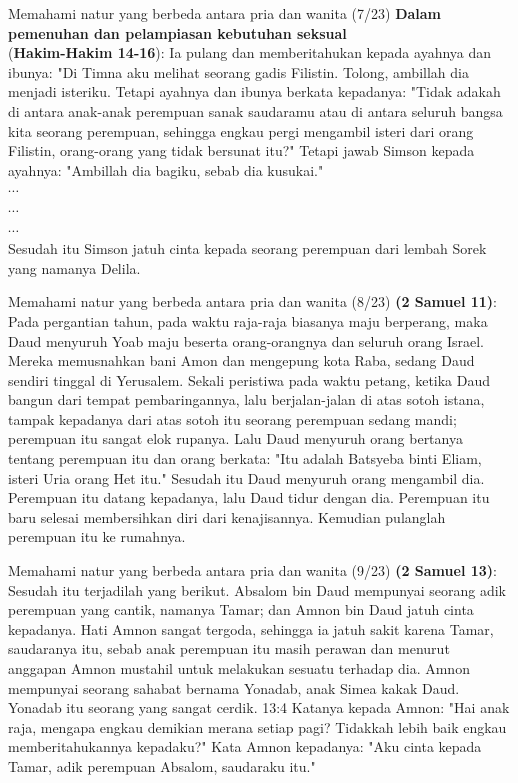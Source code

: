 \documentclass{beamer}
\theoremstyle{mystyle}
\let\emph\relax %
\begin{document}
\begin{frame}{Memahami natur yang berbeda antara pria dan wanita (7/23)}
	\textbf{Dalam pemenuhan dan pelampiasan kebutuhan seksual} \\
	\emph{Samson} (\textbf{Hakim-Hakim 14-16}):
	Ia pulang dan memberitahukan kepada ayahnya dan ibunya: "Di Timna aku melihat seorang gadis Filistin. Tolong, ambillah dia menjadi isteriku. Tetapi ayahnya dan ibunya berkata kepadanya: "Tidak adakah di antara anak-anak perempuan sanak saudaramu atau di antara seluruh bangsa kita seorang perempuan, sehingga engkau pergi mengambil isteri dari orang Filistin, orang-orang yang tidak bersunat itu?" Tetapi jawab Simson kepada ayahnya: "Ambillah dia bagiku, sebab dia kusukai." \\
	$\cdots$ \\
		$\cdots$ \\
			$\cdots$ \\
	Sesudah itu Simson jatuh cinta kepada seorang perempuan dari lembah Sorek yang namanya Delila.
\end{frame}

\begin{frame}{Memahami natur yang berbeda antara pria dan wanita (8/23)}
	\emph{Daud} \textbf{(2 Samuel 11)}: Pada pergantian tahun, pada waktu raja-raja biasanya maju berperang, maka Daud menyuruh Yoab maju beserta orang-orangnya dan seluruh orang Israel. Mereka memusnahkan bani Amon dan mengepung kota Raba, sedang Daud sendiri tinggal di Yerusalem. Sekali peristiwa pada waktu petang, ketika Daud bangun dari tempat pembaringannya, lalu berjalan-jalan di atas sotoh istana, tampak kepadanya dari atas sotoh itu seorang perempuan sedang mandi; perempuan itu sangat elok rupanya. Lalu Daud menyuruh orang bertanya tentang perempuan itu dan orang berkata: "Itu adalah Batsyeba binti Eliam, isteri Uria orang Het itu." Sesudah itu Daud menyuruh orang mengambil dia. Perempuan itu datang kepadanya, lalu Daud tidur dengan dia. Perempuan itu baru selesai membersihkan diri dari kenajisannya. Kemudian pulanglah perempuan itu ke rumahnya.	
\end{frame}

\begin{frame}{Memahami natur yang berbeda antara pria dan wanita (9/23)}
	\emph{Amnon} \textbf{(2 Samuel 13)}:  Sesudah itu terjadilah yang berikut. Absalom bin Daud mempunyai seorang adik perempuan yang cantik, namanya Tamar; dan Amnon bin Daud jatuh cinta kepadanya. Hati Amnon sangat tergoda, sehingga ia jatuh sakit karena Tamar, saudaranya itu, sebab anak perempuan itu masih perawan dan menurut anggapan Amnon mustahil untuk melakukan sesuatu terhadap dia. Amnon mempunyai seorang sahabat bernama Yonadab, anak Simea kakak Daud. Yonadab itu seorang yang sangat cerdik. 13:4 Katanya kepada Amnon: "Hai anak raja, mengapa engkau demikian merana setiap pagi? Tidakkah lebih baik engkau memberitahukannya kepadaku?" Kata Amnon kepadanya: "Aku cinta kepada Tamar, adik perempuan Absalom, saudaraku itu." 
\end{frame}
\end{document}
